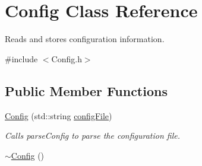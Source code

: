 \hypertarget{classConfig}{\section{Config Class Reference}
\label{classConfig}
}


Reads and stores configuration information.  




{\ttfamily \#include $<$Config.\-h$>$}

\subsection*{Public Member Functions}
\begin{DoxyCompactItemize}
\item 
\hyperlink{classConfig_ae67e338ea42e242cb5b374b6583c8b1c}{Config} (std\-::string \hyperlink{classConfig_a08b7b2c4eadf7dda51404f76fd6e0280}{config\-File})
\begin{DoxyCompactList}\small\item\em Calls parse\-Config to parse the configuration file. \end{DoxyCompactList}\item 
\hyperlink{classConfig_a543dce59b66475c5108088ee4ce1cdfc}{$\sim$\-Config} ()
\end{DoxyCompactItemize}
